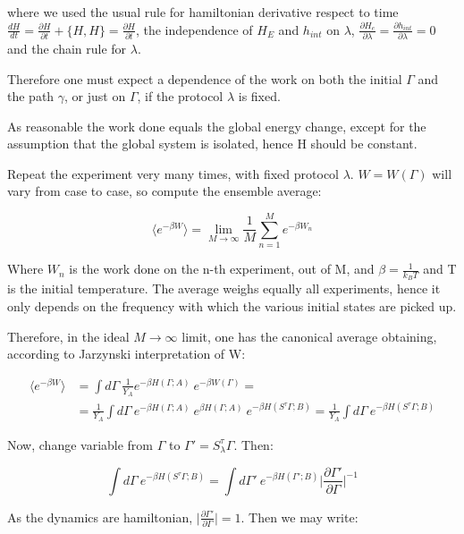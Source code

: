 \documentclass{article}
\begin{document}
where we used the usual rule for hamiltonian derivative respect to time $ \frac{dH}{dt} = \frac{\partial H}{\partial t} + \{ H,H \} = \frac{\partial H}{\partial t} $, the independence of $H_E$ and $h_{int}$ on $\lambda$, $\frac{ \partial H_e}{ \partial \lambda} = \frac{ \partial h_{int} }{ \partial \lambda} = 0 $  and the chain rule for $\lambda$.

Therefore one must expect a dependence of the work on both the initial $\Gamma$ and the path $\gamma$, or just on $\Gamma$, if the protocol $\lambda$ is fixed.

As reasonable the work done equals the global energy change, except for the assumption that the global system is isolated, hence H should be constant.

Repeat the experiment very many times, with fixed protocol $\lambda$. $W = W(\Gamma)$ will vary from case to case, so compute the ensemble average:

\begin{equation}
\langle e^{- \beta W} \rangle = \lim_{M \to \infty} \frac{1}{M} \sum_{n=1}^{M} e^{- \beta W_n}
\end{equation}

Where $W_n$ is the  work done on the n-th experiment, out of M, and $\beta = \frac{1}{k_B T}$ and T is the initial temperature.
The average weighs equally all experiments, hence it only depends on the frequency with which the various initial states are picked up. 

Therefore, in the ideal $M \to \infty$ limit, one has the canonical average obtaining, according to Jarzynski interpretation of W:

\begin{align*}
\langle e^{-\beta W} \rangle &= \int d\Gamma \ \frac{1}{Y_A} e^{-\beta H(\Gamma;A)} \ e^{-\beta W(\Gamma)} = \\
&= \frac{1}{Y_A} \int d\Gamma \ e^{-\beta H(\Gamma;A)} \ e^{\beta H(\Gamma;A)}\ e^{-\beta H(S^{\tau}\Gamma;B)} =  \frac{1}{Y_A} \int d\Gamma \ e^{-\beta H(S^{\tau}\Gamma;B)}
\end{align*}

Now, change variable from $\Gamma$ to $\Gamma' = S_{\lambda}^{\tau} \Gamma$. Then:

$$  \int d\Gamma \ e^{-\beta H(S^{\tau}\Gamma;B)} = \int d \Gamma' \  e^{-\beta H(\Gamma';B)} \big | \frac{\partial \Gamma'}{\partial \Gamma} \big |^{-1}$$

As the dynamics are hamiltonian, $\big | \frac{\partial \Gamma'}{\partial \Gamma} \big | = 1$. Then we may write:
\end{document}
